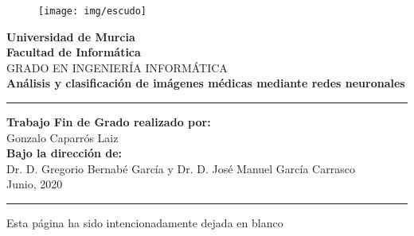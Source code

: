 \documentclass[12pt,a4paper]{article}
\title{\doctitle}
\author{\docauthor}
\date{\docdate}
\renewcommand{\headrulewidth}{0.5pt}
\renewcommand{\footrulewidth}{0.5pt}
\newcommand{\doctitle}{Análisis y clasificación de imágenes médicas mediante redes neuronales}
\newcommand{\docauthor}{Gonzalo Caparrós Laiz}
\newcommand{\docdate}{Junio, 2020}
\newcommand{\docdirector}{Dr. D. Gregorio Bernabé García y Dr. D. José Manuel García Carrasco}
\begin{document}
\renewcommand*\listtablename{Índice de tablas}
\renewcommand\spanishtablename{Tabla}
\glsunsetall

\newcommand*{\blankpage}{%
\vspace*{\fill}
{\centering Esta página ha sido intencionadamente dejada en blanco\par}
\vspace{\fill}}
\begin{titlepage}
\begin{center}
\begin{figure}[ht]
\centering
\texttt{[image: img/escudo]}
\end{figure}
\vspace{1cm}
\begin{Large}
\textbf{Universidad de Murcia\\
Facultad de Informática\\}
\vspace{0.5cm}
GRADO EN INGENIERÍA INFORMÁTICA\\
\vspace{1.0cm}
\textbf{\doctitle}
\end{Large}
\vspace{1.0cm}
\hrule
\vspace{0.2cm}
\begin{large}
\textbf{Trabajo Fin de Grado realizado por:}\\\docauthor\\
\vspace{0.2cm}
\textbf{Bajo la dirección de:}\\
\docdirector\\
\vspace{0.2cm}
\docdate\\
\end{large}
\vspace{0.5cm}
\hrule
\vspace{1cm}
\end{center}
\end{titlepage}
\renewcommand{\headrulewidth}{0.0pt}
\renewcommand{\footrulewidth}{0.0pt}
\fancyhead[L]{}
\fancyfoot[C]{}
\newpage
\blankpage
\newpage
\fancyhead[L]{\nouppercase{\leftmark}}
\renewcommand{\headrulewidth}{0.5pt}
\renewcommand{\footrulewidth}{0.5pt}
\tableofcontents

\newpage
\listoffigures
\end{document}
